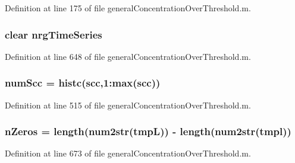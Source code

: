 Definition at line 175 of file general\-Concentration\-Over\-Threshold.\-m.

\hypertarget{a00028_ad5f4092827ae220bd7c53532aaaa0590}{
\subsubsection[{nrg\-Time\-Series}]{\setlength{\rightskip}{0pt plus 5cm}clear nrg\-Time\-Series}}\label{a00028_ad5f4092827ae220bd7c53532aaaa0590}


Definition at line 648 of file general\-Concentration\-Over\-Threshold.\-m.

\hypertarget{a00028_a0d0db21d4520f7561ff56e2c80e4fb69}{
\subsubsection[{num\-Scc}]{\setlength{\rightskip}{0pt plus 5cm}num\-Scc = histc(scc,1\-:{\bf max}(scc))}}\label{a00028_a0d0db21d4520f7561ff56e2c80e4fb69}


Definition at line 515 of file general\-Concentration\-Over\-Threshold.\-m.

\hypertarget{a00028_ac4353d99277795cadf898255e2c73c71}{
\subsubsection[{n\-Zeros}]{\setlength{\rightskip}{0pt plus 5cm}n\-Zeros = length(num2str(tmp\-L)) -\/ length(num2str(tmpl))}}\label{a00028_ac4353d99277795cadf898255e2c73c71}


Definition at line 673 of file general\-Concentration\-Over\-Threshold.\-m.

